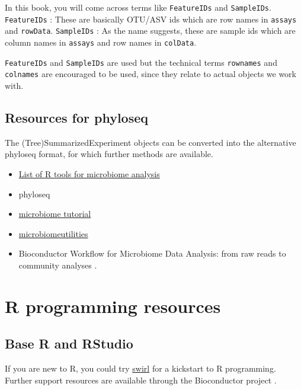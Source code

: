\documentclass[
]{book}
\providecommand{\tightlist}{%
  \setlength{\itemsep}{0pt}\setlength{\parskip}{0pt}}
\begin{document}
In this book, you will come across terms like \texttt{FeatureIDs} and
\texttt{SampleIDs}. \texttt{FeatureIDs} : These are basically OTU/ASV ids which are
row names in \texttt{assays} and \texttt{rowData}. \texttt{SampleIDs} : As the name
suggests, these are sample ids which are column names in \texttt{assays} and
row names in \texttt{colData}.

\texttt{FeatureIDs} and \texttt{SampleIDs} are used but the technical terms
\texttt{rownames} and \texttt{colnames} are encouraged to be used, since they relate
to actual objects we work with.

\hypertarget{resources-for-phyloseq}{%
\subsection{Resources for phyloseq}\label{resources-for-phyloseq}}

The (Tree)SummarizedExperiment objects can be converted into the alternative phyloseq format, for which further methods are available.

\begin{itemize}
\tightlist
\item
  \href{https://microsud.github.io/Tools-Microbiome-Analysis/}{List of R tools for microbiome analysis}
\item
  phyloseq \citep{McMurdie2013}
\item
  \href{http://microbiome.github.io/tutorials/}{microbiome tutorial}
\item
  \href{https://microsud.github.io/microbiomeutilities/}{microbiomeutilities}
\item
  Bioconductor Workflow for Microbiome Data Analysis: from raw reads to community analyses \citep{Callahan2016}.
\end{itemize}

\hypertarget{r-programming-resources}{%
\section{R programming resources}\label{r-programming-resources}}

\hypertarget{base-r-and-rstudio}{%
\subsection{Base R and RStudio}\label{base-r-and-rstudio}}

If you are new to R, you could try \href{https://swirlstats.com/}{swirl}
for a kickstart to R programming. Further support resources are
available through the Bioconductor
project \citep{Huber2015}.
\end{document}
